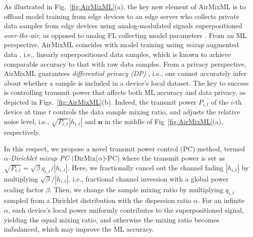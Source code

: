 \documentclass[conference,10pt]{IEEEtran}
\theoremstyle{definition}
\theoremstyle{definition}
\begin{document}
As illustrated in Fig.~\ref{fig:AirMixML}(a), the key new element of AirMixML is to offload model training from edge devices to an edge server who collects private data samples from edge devices using analog-modulated signals superpositioned \textit{over-the-air}, as opposed to analog FL collecting model parameters \cite{zhu2019broadband,koda2020differentially,liu2020privacyforfree,elgabli2020harnessing}. From an ML perspective, AirMixML coincides with model training usiing \textit{mixup} augmented data \cite{zhang2017mixup}, i.e., linearly superpositioned data samples, which is known to achieve comparable accuracy to that with raw data samples. From a privacy perspective, AirMixML guarantees \emph{differential privacy (DP)} \cite{dwork2014algorithmic}, i.e., one cannot accurately infer about whether a sample is included in a device's local dataset. The key to success is controlling transmit power that affects both ML accuracy and data privacy, as depicted in Figs.~\ref{fig:AirMixML}(b). Indeed, the transmit power $P_{i, t}$ of the $i$-th device at time $t$ controls the data sample mixing ratio, and adjusts the relative noise level, i.e., $\sqrt{P_{i, t}}|h_{i, t}|$ and $\mathbf{n}$ in the middle of Fig~\ref{fig:AirMixML}(a), respectively.

In this respect, we propose a novel transmit power control (PC) method, termed \emph{$\alpha$-Dirichlet mixup PC} (\textsf{DirMix($\alpha$)-PC}) where the transmit power is set as $\sqrt{P_{i, t}}=\sqrt{\beta}q_{i,t}/|h_{i,t}|$. Here, we fractionally cancel out the channel fading $|h_{i, t}|$ by multiplying $\sqrt{\beta}/|h_{i, t}|$, i.e., fractional channel inversion with a global power scaling factor $\beta$. Then, we change the sample mixing ratio by multiplying $q_{i,t}$ sampled from a Dirichlet distribution with the dispersion ratio $\alpha$. For an infinite $\alpha$, each device's local power uniformly contributes to the superpositioned signal, yielding the equal mixing ratio, and otherwise the mixing ratio becomes imbalanced, which may improve the ML accuracy.




\end{document}
